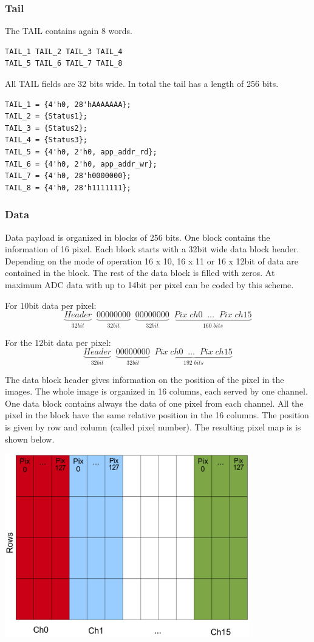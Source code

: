 \subsubsection{Tail}

The TAIL contains again 8 words.

\begin{verbatim}
TAIL_1 TAIL_2 TAIL_3 TAIL_4
TAIL_5 TAIL_6 TAIL_7 TAIL_8
\end{verbatim}

All TAIL fields are 32 bits wide. In total the tail has a length of 256 bits.
\begin{verbatim}
TAIL_1 = {4'h0, 28'hAAAAAAA};
TAIL_2 = {Status1};
TAIL_3 = {Status2};
TAIL_4 = {Status3};
TAIL_5 = {4'h0, 2'h0, app_addr_rd};
TAIL_6 = {4'h0, 2'h0, app_addr_wr};
TAIL_7 = {4'h0, 28'h0000000};
TAIL_8 = {4'h0, 28'h1111111};
\end{verbatim}


\subsubsection{Data}

Data payload is organized in blocks of 256 bits. One block contains the information of 16 pixel. Each block starts with a 32bit wide data block header. Depending on the mode of operation 16 x 10, 16 x 11 or 16 x 12bit of data are contained in the block. The rest of the data block is filled with zeros. At maximum ADC data with up to 14bit per pixel can be coded by this scheme.  

For 10bit data per pixel:
\[
\underbrace{Header}_{32bit} \; \; \underbrace{00000000}_{32bit} \;  \;\underbrace{00000000 }_{32bit} \; \; \underbrace{Pix\;ch0 \;  \; \ldots  \;  \;Pix\;ch15}_{160 \; bits}
\]

For the 12bit data per pixel:
\[
\underbrace{Header}_{32bit} \; \; \underbrace{00000000}_{32bit} \;  \; \underbrace{Pix\;ch0 \;  \; \ldots  \;  \;Pix\;ch15}_{192 \; bits}
\]


The data block header gives information on the position of the pixel in the images. 
The whole image is organized in 16 columns, each served by one channel.
One data block contains always the data of one pixel from each channel.
All the pixel in the block have the same relative position in the 16 columns. 
The position is given by row and column (called pixel number). 
The resulting pixel map is is shown below.

\includegraphics[width=0.8\textwidth]{images/pixel_map.png}

